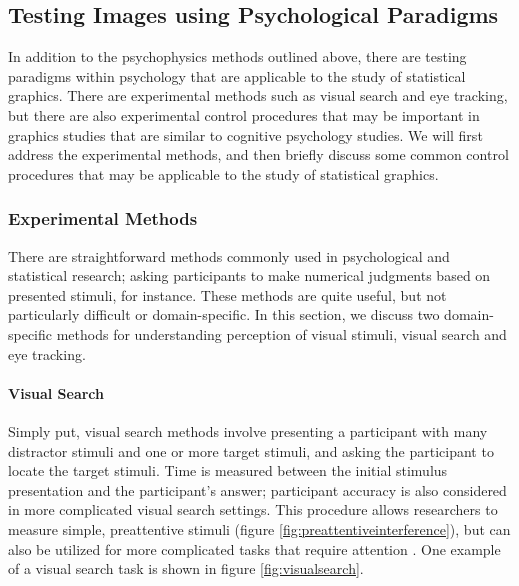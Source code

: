 \documentclass[11pt]{isuthesis}\usepackage[]{graphicx}\usepackage[]{color}
\begin{document}
\subsection{Testing Images using Psychological Paradigms}
In addition to the psychophysics methods outlined above, there are testing paradigms within psychology that are applicable to the study of statistical graphics. There are experimental methods such as visual search and eye tracking, but there are also experimental control procedures that may be important in graphics studies that are similar to cognitive psychology studies. We will first address the experimental methods, and then briefly discuss some common control procedures that may be applicable to the study of statistical graphics. 

\subsubsection{Experimental Methods}\label{experimentalmethods}
There are straightforward methods commonly used in psychological and statistical research; asking participants to make numerical judgments based on presented stimuli, for instance. These methods are quite useful, but not particularly difficult or domain-specific. In this section, we discuss two domain-specific methods for understanding perception of visual stimuli, visual search and eye tracking. 

\paragraph{Visual Search} Simply put, visual search methods involve presenting a participant with many distractor stimuli and one or more target stimuli, and asking the participant to locate the target stimuli. Time is measured between the initial stimulus presentation and the participant's answer; participant accuracy is also considered in more complicated visual search settings. This procedure allows researchers to measure simple, preattentive stimuli (figure \ref{fig:preattentiveinterference}), but can also be utilized for more complicated tasks that require attention \citep{anderson1983interactive}. One example of a visual search task is shown in figure \ref{fig:visualsearch}. 
\end{document}

